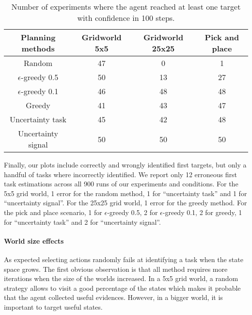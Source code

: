 \begin{table}[!htbp]
\centering
{}
\begin{tabular}{c c c c}
    Planning methods & Gridworld 5x5 & Gridworld 25x25 &  Pick and place \\ \hline
    Random & 47 & 0 & 1 \\ 
    $\epsilon$-greedy 0.5 & 50 & 13 & 27 \\
    $\epsilon$-greedy 0.1 & 46 & 48 & 48 \\
    Greedy & 41 & 43 & 47 \\
    Uncertainty task & 45 & 42 & 48 \\
    Uncertainty signal & 50 & 50 & 50 \\
\end{tabular}
\caption{Number of experiments where the agent reached at least one target with confidence in 100 steps.}
\label{tab:wordlpropertiesnreach}
\end{table}

Finally, our plots include correctly and wrongly identified first targets, but only a handful of tasks where incorrectly identified. We report only 12 erroneous first task estimations across all 900 runs of our experiments and conditions. For the 5x5 grid world, 1 error for the random method, 1 for ``uncertainty task'' and 1 for ``uncertainty signal''. For the 25x25 grid world, 1 error for the greedy method. For the pick and place scenario, 1 for $\epsilon$-greedy 0.5, 2 for $\epsilon$-greedy 0.1, 2 for greedy, 1 for ``uncertainty task'' and 2 for ``uncertainty signal''.

\paragraph{World size effects}

As expected selecting actions randomly fails at identifying a task when the state space grows. The first obvious observation is that all method requires more iterations when the size of the worlds increased. In a 5x5 grid world, a random strategy allows to visit a good percentage of the states which makes it probable that the agent collected useful evidences. However, in a bigger world, it is important to target useful states. 


